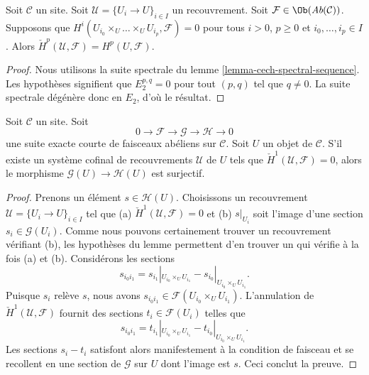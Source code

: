 \begin{lemma}
\label{lemma-cech-spectral-sequence-application}
Soit $\mathcal{C}$ un site.
Soit $\mathcal{U} = \{U_i \to U\}_{i \in I}$ un recouvrement.
Soit $\mathcal{F} \in \Ob(\textit{Ab}(\mathcal{C}))$.
Supposons que $H^i(U_{i_0} \times_U \ldots \times_U U_{i_p}, \mathcal{F}) = 0$
pour tous $i > 0$, $p \geq 0$ et $i_0, \ldots, i_p \in I$.
Alors $\check{H}^p(\mathcal{U}, \mathcal{F}) = H^p(U, \mathcal{F})$.
\end{lemma}

\begin{proof}
Nous utilisons la suite spectrale du
lemme \ref{lemma-cech-spectral-sequence}.
Les hypothèses signifient que $E_2^{p, q} = 0$ pour tout $(p, q)$ tel que
$q \not = 0$. La suite spectrale dégénère donc en $E_2$, d'où le résultat.
\end{proof}

\begin{lemma}
\label{lemma-ses-cech-h1}
Soit $\mathcal{C}$ un site.
Soit
$$
0 \to \mathcal{F} \to \mathcal{G} \to \mathcal{H} \to 0
$$
une suite exacte courte de faisceaux abéliens sur $\mathcal{C}$.
Soit $U$ un objet de $\mathcal{C}$. S'il existe un système cofinal de
recouvrements $\mathcal{U}$ de $U$ tels que
$\check{H}^1(\mathcal{U}, \mathcal{F}) = 0$,
alors le morphisme $\mathcal{G}(U) \to \mathcal{H}(U)$ est surjectif.
\end{lemma}

\begin{proof}
Prenons un élément $s \in \mathcal{H}(U)$. Choisissons un recouvrement
$\mathcal{U} = \{U_i \to U\}_{i \in I}$ tel que
(a) $\check{H}^1(\mathcal{U}, \mathcal{F}) = 0$ et (b) $s|_{U_i}$ soit
l'image d'une section $s_i \in \mathcal{G}(U_i)$.
Comme nous pouvons certainement trouver un recouvrement vérifiant (b), les
hypothèses du lemme permettent d'en trouver un qui vérifie à la fois (a) et
(b). Considérons les sections
$$
s_{i_0i_1} =
s_{i_1}|_{U_{i_0} \times_U U_{i_1}} - s_{i_0}|_{U_{i_0} \times_U U_{i_1}}.
$$
Puisque $s_i$ relève $s$, nous avons
$s_{i_0i_1} \in \mathcal{F}(U_{i_0} \times_U U_{i_1})$.
L'annulation de $\check{H}^1(\mathcal{U}, \mathcal{F})$ fournit des sections
$t_i \in \mathcal{F}(U_i)$ telles que
$$
s_{i_0i_1} =
t_{i_1}|_{U_{i_0} \times_U U_{i_1}} - t_{i_0}|_{U_{i_0} \times_U U_{i_1}}.
$$
Les sections $s_i - t_i$ satisfont alors manifestement à la condition de
faisceau et se recollent en une section de $\mathcal{G}$ sur $U$ dont l'image
est $s$. Ceci conclut la preuve.
\end{proof}

